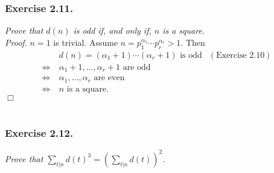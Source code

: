 \documentclass{article}
\begin{document}



\subsubsection*{Exercise 2.11.}
\emph{Prove that $d(n)$ is odd if, and only if, $n$ is a square.} \\



\emph{Proof.}
  $n = 1$ is trivial.
  Assume $n = p_1^{\alpha_1} \cdots p_r^{\alpha_r} > 1$.
  Then
  \begin{align*}
    & \:
    \text{$d(n) = (\alpha_1 + 1) \cdots (\alpha_r + 1)$ is odd}
      &(\text{Exercise 2.10}) \\
    \Longleftrightarrow & \:
    \text{$\alpha_1 + 1, \ldots, \alpha_r + 1$ are odd} \\
    \Longleftrightarrow & \:
    \text{$\alpha_1, \ldots, \alpha_r$ are even} \\
    \Longleftrightarrow & \:
    \text{$n$ is a square}.
  \end{align*}
$\Box$ \\\\






\subsubsection*{Exercise 2.12.}
\emph{Prove that $\sum_{t|n} d(t)^3 = \left(\sum_{t|n} d(t)\right)^2$.} \\
\end{document}
